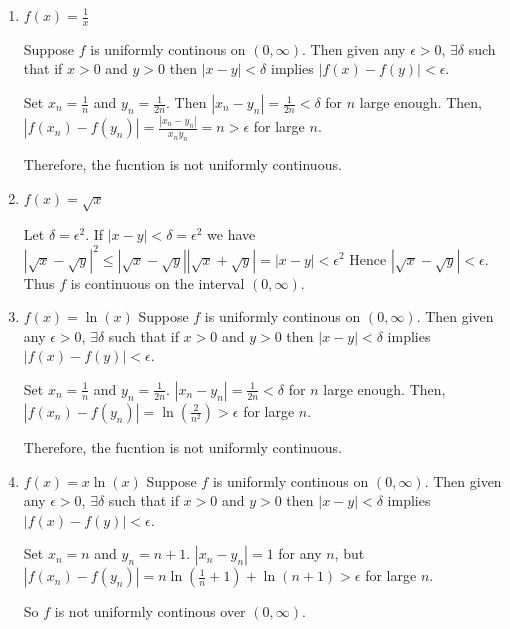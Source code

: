 \documentclass{tufte-book}
\theoremstyle{mytheoremstyle}
\theoremstyle{mylemstyle}
\theoremstyle{mydefstyle}
\begin{document}
\begin{enumerate}

\item $f(x) = \frac{1}{x}$

Suppose $f$ is uniformly continous on $(0, \infty)$.  Then given any $\epsilon > 0$, $\exists \delta$ such that if $x>0$ and $y>0$ then $|x - y| < \delta$ implies $|f(x) - f(y)| < \epsilon$.

Set $x_n = \frac{1}{n}$ and $y_n=\frac{1}{2n}$.  Then $|x_n - y_n| = \frac{1}{2n} <  \delta$ for $n$ large enough.  Then, $|f(x_n) - f(y_n)| = \frac{|x_n-y_n|}{x_ny_n} = n > \epsilon$ for large $n$.

Therefore, the fucntion is not uniformly continuous.

\item $f(x) = \sqrt{x}$

Let $\delta = \epsilon^2$.  If $|x - y| < \delta = \epsilon^2$ we have $|\sqrt{x} - \sqrt{y}|^2 \leq |\sqrt{x} - \sqrt{y}||\sqrt{x} + \sqrt{y}| = |x-y| < \epsilon^2$  Hence $|\sqrt{x} - \sqrt{y}| < \epsilon$.  Thus $f$ is continuous on the interval $(0, \infty)$.

\item $f(x) = \ln(x)$
Suppose $f$ is uniformly continous on $(0, \infty)$.  Then given any $\epsilon > 0$, $\exists \delta$ such that if $x>0$ and $y>0$ then $|x - y| < \delta$ implies $|f(x) - f(y)| < \epsilon$.

Set $x_n = \frac{1}{n}$ and $y_n = \frac{1}{2n}$.   $|x_n - y_n| = \frac{1}{2n} <  \delta$ for $n$ large enough.  Then, $|f(x_n) - f(y_n)| = \ln(\frac{2}{n^2}) > \epsilon$ for large $n$.

Therefore, the fucntion is not uniformly continuous.

\item $f(x) = x \ln(x)$
Suppose $f$ is uniformly continous on $(0, \infty)$.  Then given any $\epsilon > 0$, $\exists \delta$ such that if $x>0$ and $y>0$ then $|x - y| < \delta$ implies $|f(x) - f(y)| < \epsilon$.

Set $x_n = n$ and $y_n = n+1$.   $|x_n - y_n| = 1$ for any $n$, but $|f(x_n) - f(y_n)| = n \ln(\frac{1}{n} + 1) + \ln(n+1) > \epsilon$ for large $n$.

So $f$ is not uniformly continous over $(0, \infty)$.
\end{enumerate}
\end{document}
